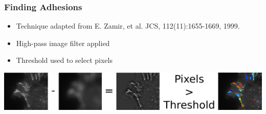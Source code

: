 \documentclass{beamer}
\begin{document}
\begin{frame}
	\frametitle{Finding Adhesions}
	 \begin{itemize}
	 \item Technique adapted from E. Zamir, et al. JCS, 112(11):1655-1669, 1999.
	 \item High-pass image filter applied
	 \item Threshold used to select pixels
	 \end{itemize}
	 \bigskip
	 \begin{center}
	 \includegraphics[width=\textwidth]{figures/finding/pixel_ID/adhesion_pixel_ID}
	 \end{center}
\end{frame}
\end{document}
